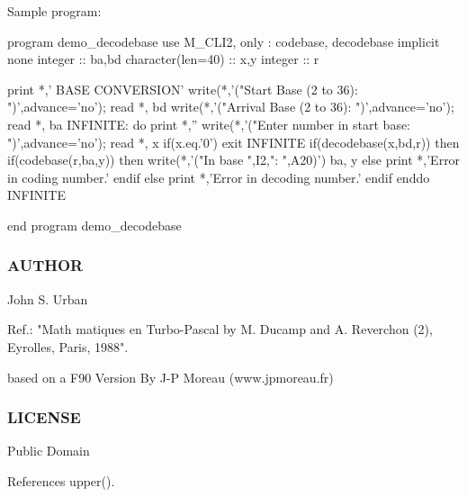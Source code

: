 Sample program\+: \begin{DoxyVerb} program demo_decodebase
 use M_CLI2, only : codebase, decodebase
 implicit none
 integer           :: ba,bd
 character(len=40) :: x,y
 integer           :: r

 print *,' BASE CONVERSION'
 write(*,'("Start   Base (2 to 36): ")',advance='no'); read *, bd
 write(*,'("Arrival Base (2 to 36): ")',advance='no'); read *, ba
 INFINITE: do
    print *,''
    write(*,'("Enter number in start base: ")',advance='no'); read *, x
    if(x.eq.'0') exit INFINITE
    if(decodebase(x,bd,r)) then
       if(codebase(r,ba,y)) then
         write(*,'("In base ",I2,": ",A20)')  ba, y
       else
         print *,'Error in coding number.'
       endif
    else
       print *,'Error in decoding number.'
    endif
 enddo INFINITE

 end program demo_decodebase
\end{DoxyVerb}


\subsubsection*{A\+U\+T\+H\+OR}

John S. Urban

Ref.\+: "Math matiques en Turbo-\/\+Pascal by M. Ducamp and A. Reverchon (2), Eyrolles, Paris, 1988".

based on a F90 Version By J-\/P Moreau (www.\+jpmoreau.\+fr)

\subsubsection*{L\+I\+C\+E\+N\+SE}

Public Domain 

References upper().

